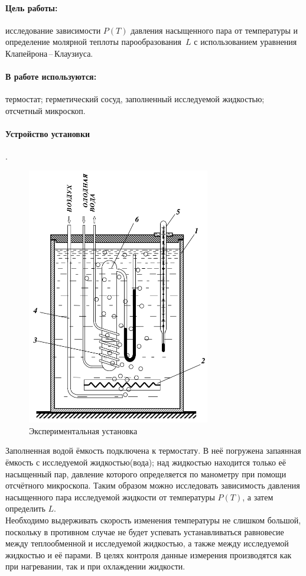 \documentclass{letnab}
\begin{document}


\paragraph{Цель работы:}
исследование зависимости $P(T)$ давления насыщенного пара от температуры
и определение молярной теплоты парообразования~$L$
с использованием уравнения Клапейрона\,--\,Клаузиуса.
\paragraph{В работе используются:}термостат; герметический сосуд, заполненный исследуемой жидкостью; отсчетный микроскоп.
\paragraph{Устройство установки}.\\
\begin{minipage}{90mm}
	\begin{figure}[H]
	\includegraphics[width = 80mm]{station.png}
	\caption{Экспериментальная установка}
	\end{figure}
\end{minipage}
\begin{minipage}{90 mm}
	Заполненная водой ёмкость подключена к термостату. В неё погружена запаянная ёмкость с исследуемой жидкостью(вода); над жидкостью находится только её насыщенный пар, давление которого определяется по манометру при помощи отсчётного микроскопа. Таким образом можно исследовать зависимость давления насыщенного
	пара исследуемой жидкости от температуры $P(T)$, а затем определить $L$.\\[0.4cm]
	Необходимо выдерживать скорость изменения температуры не слишком большой, поскольку в противном случае не будет успевать устанавливаться равновесие между теплообменной и исследуемой жидкостью, а также между исследуемой жидкостью и её парами. В целях контроля данные измерения производятся как при нагревании, так и при охлаждении жидкости. 
\end{minipage}
\end{document}
